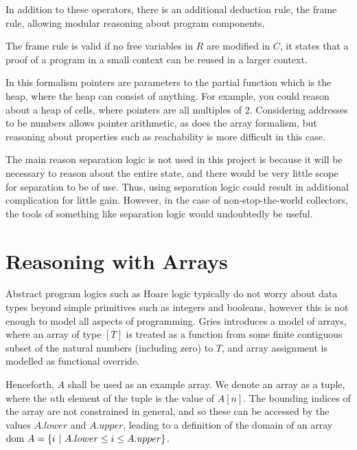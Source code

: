 In addition to these operators, there is an additional deduction rule,
the frame rule, allowing modular reasoning about program components,

\begin{prooftree}
\end{prooftree}

The frame rule is valid if no free variables in $R$ are modified in
$C$, it states that a proof of a program in a small context can be
reused in a larger context.

In this formalism pointers are parameters to the partial function
which is the heap, where the heap can consist of anything. For
example, you could reason about a heap of cells, where pointers are
all multiples of 2. Considering addresses to be numbers allows pointer
arithmetic, as does the array formalism, but reasoning about
properties such as reachability is more difficult in this case.

The main reason separation logic is not used in this project is
because it will be necessary to reason about the entire state, and
there would be very little scope for separation to be of use. Thus,
using separation logic could result in additional complication for
little gain. However, in the case of non-stop-the-world collectors,
the tools of something like separation logic would undoubtedly be
useful.

\section{Reasoning with Arrays}
\label{sec:heap-arrays}

Abstract program logics such as Hoare logic typically do not worry
about data types beyond simple primitives such as integers and
booleans, however this is not enough to model all aspects of
programming. Gries introduces a model of arrays\cite{Gries87}, where
an array of type $[T]$ is treated as a function from some finite
contiguous subset of the natural numbers (including zero) to $T$, and
array assignment is modelled as functional override.

Henceforth, $A$ shall be used as an example array. We denote an array
as a tuple, where the $n$th element of the tuple is the value of
$A[n]$. The bounding indices of the array are not constrained in
general, and so these can be accessed by the values $A.lower$ and
$A.upper$, leading to a definition of the domain of an array $\dom~A =
\{i~|~A.lower \leq i \leq A.upper\}$.

